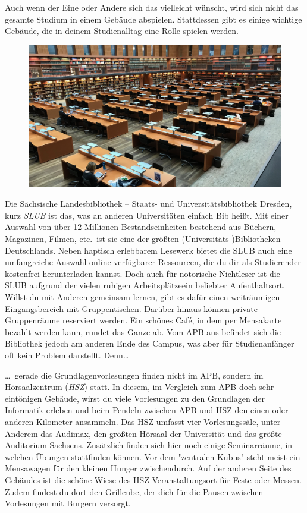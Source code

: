 
Auch wenn der Eine oder Andere sich das vielleicht wünscht, wird sich nicht das gesamte Studium in einem Gebäude abspielen.
Stattdessen gibt es einige wichtige Gebäude, die in deinem Studienalltag eine Rolle spielen werden.

\begin{figure}[b!]
    \centering
    \includegraphics[width=\linewidth]{img/slub-lesesaal}
\end{figure}

Die Sächsische Landesbibliothek – Staats- und Universitätsbibliothek Dresden, kurz \emph{SLUB} ist das, was an anderen Universitäten einfach Bib heißt.
Mit einer Auswahl von über 12 Millionen Bestandseinheiten bestehend aus Büchern, Magazinen, Filmen, etc.\ ist sie eine der größten (Universitäts-)Bibliotheken Deutschlands.
Neben haptisch erlebbarem Lesewerk bietet die SLUB auch eine umfangreiche Auswahl online verfügbarer Ressourcen, die du dir als Studierender kostenfrei herunterladen kannst.
Doch auch für notorische Nichtleser ist die SLUB aufgrund der vielen ruhigen Arbeitsplätzeein beliebter Aufenthaltsort.
Willst du mit Anderen gemeinsam lernen, gibt es dafür einen weiträumigen Eingangsbereich mit Gruppentischen.
Darüber hinaus können private Gruppenräume reserviert werden. Ein schönes Café, in dem per Mensakarte bezahlt werden kann, rundet das Ganze ab.
Vom APB aus befindet sich die Bibliothek jedoch am anderen Ende des Campus, was aber für Studienanfänger oft kein Problem darstellt. Denn\dots

\dots\ gerade die Grundlagenvorlesungen finden nicht im APB, sondern im Hörsaalzentrum (\emph{HSZ}) statt.
In diesem, im Vergleich zum APB doch sehr eintönigen Gebäude, wirst du viele Vorlesungen zu den Grundlagen der Informatik erleben und beim Pendeln zwischen APB und HSZ den einen oder anderen Kilometer ansammeln.
Das HSZ umfasst vier Vorlesungssäle, unter Anderem das Audimax, den größten Hörsaal der Universität und das größte Auditorium Sachsens.
Zusätzlich finden sich hier noch einige Seminarräume, in welchen Übungen stattfinden können. Vor dem "zentralen Kubus" steht meist ein Mensawagen für den kleinen Hunger zwischendurch.
Auf der anderen Seite des Gebäudes ist die schöne Wiese des HSZ Veranstaltungsort für Feste oder Messen.
Zudem findest du dort den Grillcube, der dich für die Pausen zwischen Vorlesungen mit Burgern versorgt.


